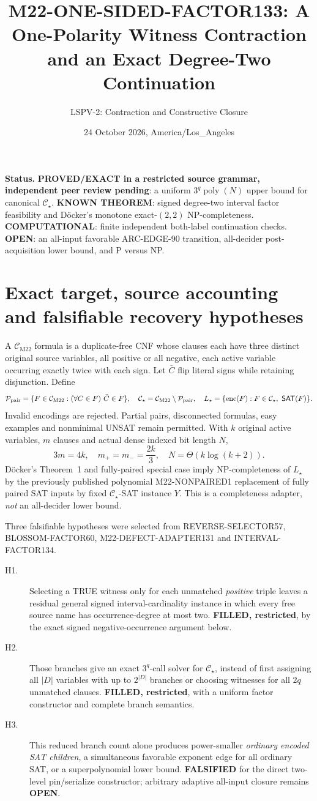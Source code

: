 \documentclass[11pt]{article}
\title{M22-ONE-SIDED-FACTOR133: A One-Polarity Witness Contraction and an Exact Degree-Two Continuation}
\author{LSPV-2: Contraction and Constructive Closure}
\date{24 October 2026, America/Los\_Angeles}
\newcommand{\CM}{\mathcal C_{\mathrm{M22}}}
\newcommand{\CS}{\mathcal C_{\star}}
\newcommand{\SAT}{\mathsf{SAT}}
\begin{document}
\maketitle
\noindent\textbf{Status.} \textbf{PROVED/EXACT in a restricted source grammar, independent peer review pending}: a uniform $3^q\operatorname{poly}(N)$ upper bound for canonical $\CS$. \textbf{KNOWN THEOREM}: signed degree-two interval factor feasibility and D\"ocker's monotone exact-$(2,2)$ NP-completeness. \textbf{COMPUTATIONAL}: finite independent both-label continuation checks. \textbf{OPEN}: an all-input favorable ARC-EDGE-90 transition, all-decider post-acquisition lower bound, and P versus NP.

\section{Exact target, source accounting and falsifiable recovery hypotheses}
A $\CM$ formula is a duplicate-free CNF whose clauses each have three distinct original source variables, all positive or all negative, each active variable occurring exactly twice with each sign. Let $\bar C$ flip literal signs while retaining disjunction. Define
\[
\mathcal P_{\rm pair}=\{F\in\CM:(\forall C\in F)\ \bar C\in F\},\quad
\CS=\CM\setminus\mathcal P_{\rm pair},\quad
L_\star=\{\operatorname{enc}(F):F\in\CS,\ \SAT(F)\}.
\]
Invalid encodings are rejected. Partial pairs, disconnected formulas, easy examples and nonminimal UNSAT remain permitted. With $k$ original active variables, $m$ clauses and actual dense indexed bit length $N$,
\[
3m=4k,\quad m_+=m_-=\frac{2k}{3},\quad N=\Theta(k\log(k+2)).
\]
D\"ocker's Theorem~1 and fully-paired special case imply NP-completeness of $L_\star$ by the previously published polynomial M22-NONPAIRED1 replacement of fully paired SAT inputs by fixed $\CS$-SAT instance $Y$. This is a completeness adapter, \emph{not} an all-decider lower bound.

Three falsifiable hypotheses were selected from REVERSE-SELECTOR57, BLOSSOM-FACTOR60, M22-DEFECT-ADAPTER131 and INTERVAL-FACTOR134.
\begin{description}
\item[H1.] Selecting a TRUE witness only for each unmatched \emph{positive} triple leaves a residual general signed interval-cardinality instance in which every free source name has occurrence-degree at most two. \textbf{FILLED, restricted}, by the exact signed negative-occurrence argument below.
\item[H2.] Those branches give an exact $3^q$-call solver for $\CS$, instead of first assigning all $|D|$ variables with up to $2^{|D|}$ branches or choosing witnesses for all $2q$ unmatched clauses. \textbf{FILLED, restricted}, with a uniform factor constructor and complete branch semantics.
\item[H3.] This reduced branch count alone produces power-smaller \emph{ordinary encoded SAT children}, a simultaneous favorable exponent edge for all ordinary SAT, or a superpolynomial lower bound. \textbf{FALSIFIED} for the direct two-level pin/serialize constructor; arbitrary adaptive all-input closure remains \textbf{OPEN}.
\end{description}
\end{document}
